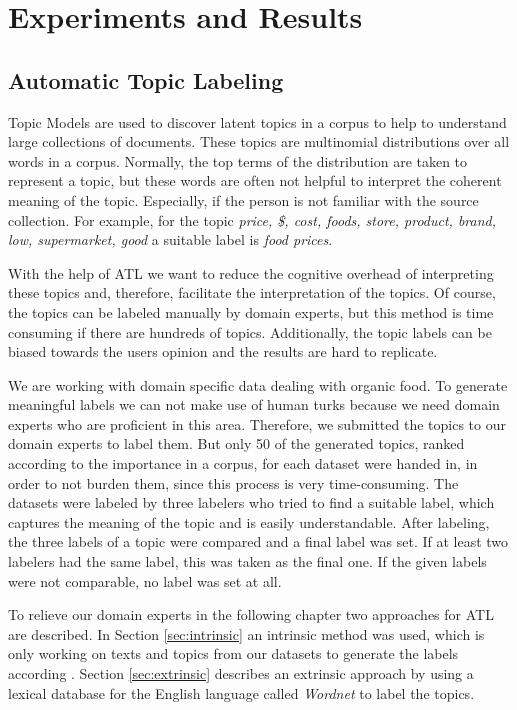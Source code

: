 \chapter{Experiments and Results}
\label{chap4}
\section{Automatic Topic Labeling}
\label{automaticTL}
Topic Models are used to discover latent topics in a corpus to help to understand large collections of documents. These topics are multinomial distributions over all words in a corpus. Normally, the top terms of the distribution are taken to represent a topic, but these words are often not helpful to interpret the coherent meaning of the topic. Especially, if the person is not familiar with the source collection. For example, for the topic \textit{price, \$, cost, foods, store, product, brand, low, supermarket, good} a  suitable label is \textit{food prices}.

With the help of \acf{ATL} we want to reduce the cognitive overhead of interpreting these topics and, therefore, facilitate the interpretation of the topics.
Of course, the topics can be labeled manually by domain experts, but this method is time consuming if there are hundreds of topics. Additionally, the topic labels can be biased towards the users opinion and the results are hard to replicate. 

We are working with domain specific data dealing with organic food. To generate meaningful labels we can not make use of human turks because we need domain experts who are proficient in this area. Therefore, we submitted the topics to our domain experts to label them. But only 50 of the generated topics, ranked according to the importance in a corpus, for each dataset were handed in, in order to not burden them, since this process is very time-consuming. The datasets were labeled by three labelers who tried to find a suitable label, which captures the meaning of the topic and is easily understandable. After labeling, the three labels of a topic were compared and a final label was set. If at least two labelers had the same label, this was taken as the final one. If the given labels were not comparable, no label was set at all. 

To relieve our domain experts in the following chapter two approaches for \ac{ATL} are described. In Section \ref{sec:intrinsic} an intrinsic method was used, which is only working on texts and topics from our datasets to generate the labels according \cite{Mei2007}. Section \ref{sec:extrinsic} describes an extrinsic approach by using a lexical database for the English language called \textit{Wordnet} to label the topics.

